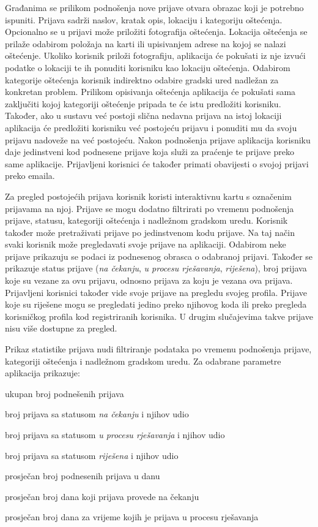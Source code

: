 		Građanima se prilikom podnošenja nove prijave otvara obrazac koji je potrebno ispuniti. Prijava sadrži naslov, kratak opis, lokaciju i kategoriju oštećenja. Opcionalno se u prijavi može priložiti fotografija oštećenja. Lokacija oštećenja se prilaže odabirom položaja na karti ili upisivanjem adrese na kojoj se nalazi oštećenje. Ukoliko korisnik priloži fotografiju, aplikacija će pokušati iz nje izvući podatke o lokaciji te ih ponuditi korisniku kao lokaciju oštećenja. Odabirom kategorije oštećenja korisnik indirektno odabire gradski ured nadležan za konkretan problem. Prilikom opisivanja oštećenja aplikacija će pokušati sama zaključiti kojoj kategoriji oštećenje pripada te će istu predložiti korisniku. Također, ako u sustavu već postoji slična nedavna prijava na istoj lokaciji aplikacija će predložiti korisniku već postojeću prijavu i ponuditi mu da svoju prijavu nadoveže na već postojeću. Nakon podnošenja prijave aplikacija korisniku daje jedinstveni kod podnesene prijave koja služi za praćenje te prijave preko same aplikacije. Prijavljeni korisnici će također primati obavijesti o svojoj prijavi preko emaila.
		
		Za pregled postojećih prijava korisnik koristi interaktivnu kartu s označenim prijavama na njoj. Prijave se mogu dodatno filtrirati po vremenu podnošenja prijave, statusu, kategoriji oštećenja i nadležnom gradskom uredu. Korisnik također može pretraživati prijave po jedinstvenom kodu prijave. Na taj način svaki korisnik može pregledavati svoje prijave na aplikaciji. Odabirom neke prijave prikazuju se podaci iz podnesenog obrasca o odabranoj prijavi. Također se prikazuje status prijave (\textit{na čekanju}, \textit{u procesu rješavanja}, \textit{riješena}), broj prijava koje su vezane za ovu prijavu, odnosno prijava za koju je vezana ova prijava. Prijavljeni korisnici također vide svoje prijave na pregledu svojeg profila. Prijave koje su riješene mogu se pregledati jedino preko njihovog koda ili preko pregleda korisničkog profila kod registriranih korisnika. U drugim slučajevima takve prijave nisu više dostupne za pregled.
		
		Prikaz statistike prijava nudi filtriranje podataka po vremenu podnošenja prijave, kategoriji oštećenja i nadležnom gradskom uredu. Za odabrane parametre aplikacija prikazuje:
		\begin{packed_item} 
			\item ukupan broj podnešenih prijava
			\item broj prijava sa statusom \textit{na čekanju} i njihov udio
			\item broj prijava sa statusom \textit{u procesu rješavanja} i njihov udio
			\item broj prijava sa statusom \textit{riješena} i njihov udio
			\item prosječan broj podnesenih prijava u danu
			\item prosječan broj dana koji prijava provede na čekanju
			\item prosječan broj dana za vrijeme kojih je prijava u procesu rješavanja
		\end{packed_item}
		
